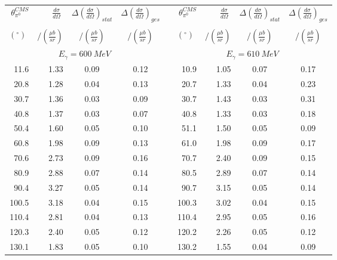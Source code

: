 \begin{table}[htbp] 
\begin{center} 
\begin{tabular}{|r|r|c|c|l|r|r|c|c|} 

\cline{1-4}
\cline{6-9} 
$\theta_{\pi^0}^{CMS}$ & 
$\displaystyle\frac{d\sigma}{d\Omega}\;$ & 
${\Delta}\left( \frac{d\sigma}{d\Omega}\right)_{stat}$ & 
${\Delta}\left( \frac{d\sigma}{d\Omega}\right)_{ges}$ & & 
$\theta_{\pi^0}^{CMS}$ & 
$\displaystyle\frac{d\sigma}{d\Omega}\;$ & 
${\Delta}\left( \frac{d\sigma}{d\Omega}\right)_{stat}$ & 
${\Delta}\left( \frac{d\sigma}{d\Omega}\right)_{ges}$ \\ 
& & & & & & & &\\ 
 $(^{\circ})\;$ & $/(\frac{{\mu}b}{sr})$ & $/(\frac{{\mu}b}{sr})$ & $/(\frac{{\mu}b}{sr})$ & & $(^{\circ})\;$ & $/(\frac{{\mu}b}{sr})$ & $/(\frac{{\mu}b}{sr})$ & $/(\frac{{\mu}b}{sr})$ \\ 
\cline{1-4} 
\cline{6-9} 
\multicolumn{4}{|c|}{ $E_{\gamma}=600~MeV$} & & 
\multicolumn{4}{c|}{ $E_{\gamma}=610~MeV$} \\ 
\cline{1-4} 
\cline{6-9} 
 11.6 &  1.33 &  0.09 &  0.12 & &  10.9 &  1.05 &  0.07 &  0.17 \\ 
 20.8 &  1.28 &  0.04 &  0.13 & &  20.7 &  1.33 &  0.04 &  0.23 \\ 
 30.7 &  1.36 &  0.03 &  0.09 & &  30.7 &  1.43 &  0.03 &  0.31 \\ 
 40.8 &  1.37 &  0.03 &  0.07 & &  40.8 &  1.33 &  0.03 &  0.18 \\ 
 50.4 &  1.60 &  0.05 &  0.10 & &  51.1 &  1.50 &  0.05 &  0.09 \\ 
 60.8 &  1.98 &  0.09 &  0.13 & &  61.0 &  1.98 &  0.09 &  0.17 \\ 
 70.6 &  2.73 &  0.09 &  0.16 & &  70.7 &  2.40 &  0.09 &  0.15 \\ 
 80.9 &  2.88 &  0.07 &  0.14 & &  80.5 &  2.89 &  0.07 &  0.14 \\ 
 90.4 &  3.27 &  0.05 &  0.14 & &  90.7 &  3.15 &  0.05 &  0.14 \\ 
100.5 &  3.18 &  0.04 &  0.15 & & 100.3 &  3.02 &  0.04 &  0.15 \\ 
110.4 &  2.81 &  0.04 &  0.13 & & 110.4 &  2.95 &  0.05 &  0.16 \\ 
120.3 &  2.40 &  0.05 &  0.12 & & 120.2 &  2.26 &  0.05 &  0.12 \\ 
130.1 &  1.83 &  0.05 &  0.10 & & 130.2 &  1.55 &  0.04 &  0.09 \\ 

\end{tabular}
\end{center}
\end{table}

